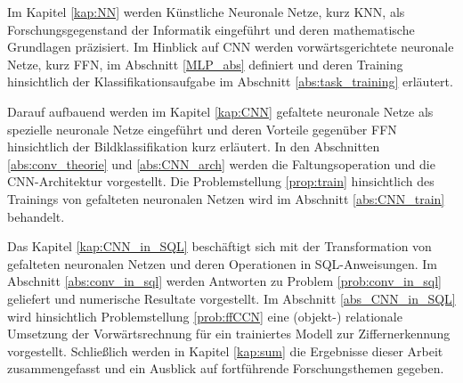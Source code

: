 Im Kapitel \ref{kap:NN} werden Künstliche Neuronale Netze, kurz KNN, als Forschungsgegenstand der Informatik eingeführt und deren mathematische Grundlagen präzisiert. Im Hinblick auf CNN werden vorwärtsgerichtete neuronale Netze, kurz FFN, im Abschnitt \ref{MLP_abs} definiert und deren Training hinsichtlich der Klassifikationsaufgabe im Abschnitt \ref{abs:task_training} erläutert. 

Darauf aufbauend werden im Kapitel \ref{kap:CNN} gefaltete neuronale Netze als spezielle neuronale Netze eingeführt und deren Vorteile gegenüber FFN hinsichtlich der Bildklassifikation kurz erläutert. In den Abschnitten \ref{abs:conv_theorie} und \ref{abs:CNN_arch} werden die Faltungsoperation und die CNN-Architektur vorgestellt. Die Problemstellung \ref{prop:train} hinsichtlich des Trainings von gefalteten neuronalen Netzen wird im Abschnitt \ref{abs:CNN_train} behandelt.

Das Kapitel \ref{kap:CNN_in_SQL} beschäftigt sich mit der Transformation von gefalteten neuronalen Netzen und deren Operationen in SQL-Anweisungen. Im Abschnitt \ref{abs:conv_in_sql} werden Antworten zu Problem \ref{prob:conv_in_sql} geliefert und numerische Resultate vorgestellt. Im Abschnitt \ref{abs_CNN_in_SQL} wird hinsichtlich Problemstellung \ref{prob:ffCCN} eine (objekt-) relationale Umsetzung der
Vorwärtsrechnung für ein trainiertes Modell zur Ziffernerkennung vorgestellt. Schließlich werden in Kapitel \ref{kap:sum} die Ergebnisse dieser Arbeit zusammengefasst und ein Ausblick auf fortführende Forschungsthemen gegeben.